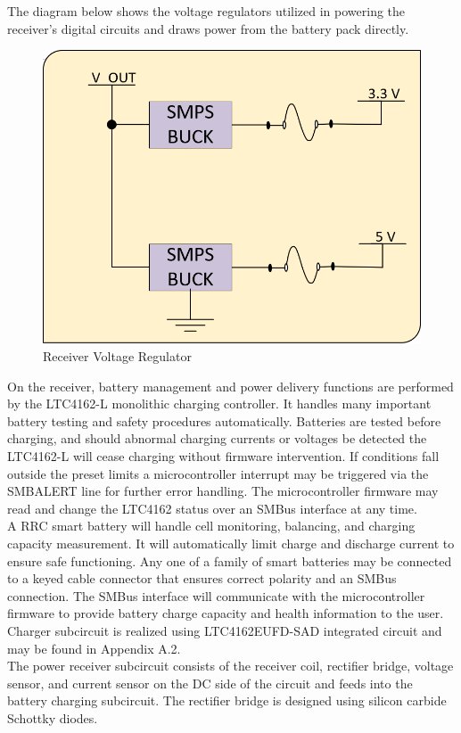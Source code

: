 \documentclass[12pt]{article}
\begin{document}
\indent
The diagram below shows the voltage regulators utilized in powering the receiver’s digital circuits and draws power from the battery pack directly.
\hfill

\begin{figure}[h!]
\centering
\includegraphics[width=0.45\linewidth]{recv_sub_volt_reg}
\caption{Receiver Voltage Regulator}
\end{figure}

\hfill
\pagebreak

\indent
On the receiver, battery management and power delivery functions are performed by the LTC4162-L monolithic charging controller. It handles many important battery testing and safety procedures automatically. Batteries are tested before charging, and should abnormal charging currents or voltages be detected the LTC4162-L will cease charging without firmware intervention. If conditions fall outside the preset limits a microcontroller interrupt may be triggered via the SMBALERT line for further error handling. The microcontroller firmware may read and change the LTC4162 status over an SMBus interface at any time.\\

\indent
A RRC smart battery will handle cell monitoring, balancing, and charging capacity measurement. It will automatically limit charge and discharge current to ensure safe functioning. Any one of a family of smart batteries may be connected to a keyed cable connector that ensures correct polarity and an SMBus connection. The SMBus interface will communicate with the microcontroller firmware to provide battery charge capacity and health information to the user.\\

\indent
Charger subcircuit is realized using LTC4162EUFD-SAD integrated circuit and may be found in Appendix A.2.\\

\indent
The power receiver subcircuit consists of the receiver coil, rectifier bridge, voltage sensor, and current sensor on the DC side of the circuit and feeds into the battery charging subcircuit. The rectifier bridge is designed using silicon carbide Schottky diodes.\\
\end{document}
